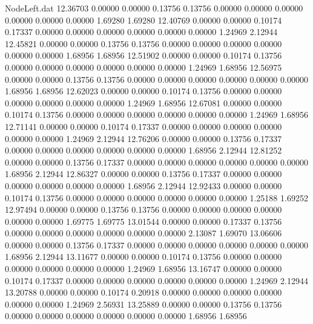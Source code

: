 \begin{filecontents}{NodeLeft.dat}
  12.36703    0.00000    0.00000     0.13756    0.13756    0.00000    0.00000    0.00000    0.00000    0.00000    0.00000    1.69280    1.69280
  12.40769    0.00000    0.00000     0.10174    0.17337    0.00000    0.00000    0.00000    0.00000    0.00000    0.00000    1.24969    2.12944
  12.45821    0.00000    0.00000     0.13756    0.13756    0.00000    0.00000    0.00000    0.00000    0.00000    0.00000    1.68956    1.68956
  12.51902    0.00000    0.00000     0.10174    0.13756    0.00000    0.00000    0.00000    0.00000    0.00000    0.00000    1.24969    1.68956
  12.56975    0.00000    0.00000     0.13756    0.13756    0.00000    0.00000    0.00000    0.00000    0.00000    0.00000    1.68956    1.68956
  12.62023    0.00000    0.00000     0.10174    0.13756    0.00000    0.00000    0.00000    0.00000    0.00000    0.00000    1.24969    1.68956
  12.67081    0.00000    0.00000     0.10174    0.13756    0.00000    0.00000    0.00000    0.00000    0.00000    0.00000    1.24969    1.68956
  12.71141    0.00000    0.00000     0.10174    0.17337    0.00000    0.00000    0.00000    0.00000    0.00000    0.00000    1.24969    2.12944
  12.76206    0.00000    0.00000     0.13756    0.17337    0.00000    0.00000    0.00000    0.00000    0.00000    0.00000    1.68956    2.12944
  12.81252    0.00000    0.00000     0.13756    0.17337    0.00000    0.00000    0.00000    0.00000    0.00000    0.00000    1.68956    2.12944
  12.86327    0.00000    0.00000     0.13756    0.17337    0.00000    0.00000    0.00000    0.00000    0.00000    0.00000    1.68956    2.12944
  12.92433    0.00000    0.00000     0.10174    0.13756    0.00000    0.00000    0.00000    0.00000    0.00000    0.00000    1.25188    1.69252
  12.97494    0.00000    0.00000     0.13756    0.13756    0.00000    0.00000    0.00000    0.00000    0.00000    0.00000    1.69775    1.69775
  13.01544    0.00000    0.00000     0.17337    0.13756    0.00000    0.00000    0.00000    0.00000    0.00000    0.00000    2.13087    1.69070
  13.06606    0.00000    0.00000     0.13756    0.17337    0.00000    0.00000    0.00000    0.00000    0.00000    0.00000    1.68956    2.12944
  13.11677    0.00000    0.00000     0.10174    0.13756    0.00000    0.00000    0.00000    0.00000    0.00000    0.00000    1.24969    1.68956
  13.16747    0.00000    0.00000     0.10174    0.17337    0.00000    0.00000    0.00000    0.00000    0.00000    0.00000    1.24969    2.12944
  13.20788    0.00000    0.00000     0.10174    0.20918    0.00000    0.00000    0.00000    0.00000    0.00000    0.00000    1.24969    2.56931
  13.25889    0.00000    0.00000     0.13756    0.13756    0.00000    0.00000    0.00000    0.00000    0.00000    0.00000    1.68956    1.68956

\end{filecontents}
